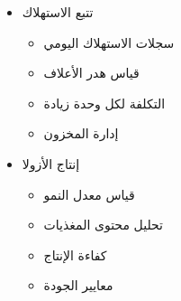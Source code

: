 \begin{itemize}
\begin{itemize}
        \item تتبع الاستهلاك
        \begin{itemize}
            \item سجلات الاستهلاك اليومي
            \item قياس هدر الأعلاف
            \item التكلفة لكل وحدة زيادة
            \item إدارة المخزون
        \end{itemize}
        
        \item إنتاج الأزولا
        \begin{itemize}
            \item قياس معدل النمو
            \item تحليل محتوى المغذيات
            \item كفاءة الإنتاج
            \item معايير الجودة
        \end{itemize}
    \end{itemize}
\end{itemize}

